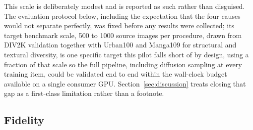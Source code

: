 \documentclass[review]{elsarticle}
\begin{document}
This scale is deliberately modest and is reported as such rather than disguised. The evaluation protocol below, including the expectation that the four causes would not separate perfectly, was fixed before any results were collected; its target benchmark scale, 500 to 1000 source images per procedure, drawn from DIV2K validation together with Urban100 and Manga109 for structural and textural diversity, is one specific target this pilot falls short of by design, using a fraction of that scale so the full pipeline, including diffusion sampling at every training item, could be validated end to end within the wall-clock budget available on a single consumer GPU. Section~\ref{sec:discussion} treats closing that gap as a first-class limitation rather than a footnote.

\subsection{Fidelity}
\end{document}

